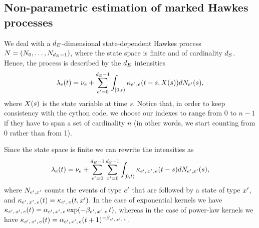 \documentclass[10pt, article,table]{article}
\begin{document}





\newpage 

\subsection{Non-parametric estimation of marked Hawkes processes}\label{sec.nonparam_estim}

We deal with a $\numEventTypes$-dimensional state-dependent Hawkes process $\multiCountingProc=(\countingProc[0], \dots, \countingProc[\numEventTypes-1])$, where the state space is finite and of cardinality $\numStates$. Hence, the process is described by the $\numEventTypes$ intensities
\begin{equation*}
 \intensity(t) = \baseRate_e + \sum_{\eone =0}^{\numEventTypes - 1}\int_{[0,t)} \hawkesKernel\subscriptee (t-s,\stateVariable(s))d\countingProc[\eone](s),
\end{equation*}
where $\stateVariable(s)$ is the state variable at time $s$. Notice that, in order to keep consistency with the cython code, we choose our indexes to range from $0$ to $n-1$ if they have to span a set of cardinality $n$ (in other words, we start counting from 0 rather than from 1). 

Since the state space is finite we can rewrite the intensities as 
\begin{equation*}
 \intensity(t) = \baseRate_e + \sum_{\eone =0}^{\numEventTypes - 1}\sum_{\xone=0}^{\numStates-1} \int_{[0,t)} \hawkesKernel\subscriptexe (t-s)d\countingProc[\eone, \xone](s),
\end{equation*}
where $\countingProc[\eone, \xone]$ counts the events of type $\eone$ that are followed by a state of type $\xone$, and $\hawkesKernel\subscriptexe(t) = \hawkesKernel\subscriptee(t,\xone)$. In the case of exponential kernels we have $\hawkesKernel\subscriptexe(t) = \impCoef\subscriptexe \exp(-\decCoef\subscriptexe \, t)$, whereas in the case of power-law kernels we have $\hawkesKernel\subscriptexe(t) = \impCoef\subscriptexe (t+1)^{-\decCoef\subscriptexe}$. 
\end{document}
